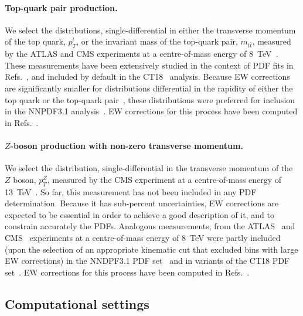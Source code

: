 \paragraph{Top-quark pair production.}
We select the distributions, single-differential in either the transverse
momentum of the top quark, $p_T^t$, or the invariant mass of the top-quark
pair, $m_{t\bar t}$, measured by the ATLAS and CMS experiments at a centre-of-mass
energy of 8~TeV~\cite{Aad:2015mbv,Khachatryan:2015oqa}. These measurements have
been extensively studied in the context of PDF fits in
Refs.~\cite{Czakon:2016olj,Bailey:2019yze,Amoroso:2020lgh,Kadir:2020yml}, and
included by default in the CT18~\cite{Hou:2019efy} analysis.
Because EW corrections are significantly smaller for distributions differential
in the rapidity of either the top quark or the top-quark
pair~\cite{Czakon:2017wor}, these distributions were preferred for inclusion
in the NNPDF3.1 analysis~\cite{Ball:2017nwa}. EW corrections for this process
have been computed in Refs.~\cite{Bernreuther:2010ny,Hollik:2011ps,Kuhn:2011ri,Bernreuther:2012sx,Pagani:2016caq,Czakon:2017wor,Czakon:2017lgo,Czakon:2017mmr,Czakon:2019bcq,Czakon:2019txp}.

\paragraph{$Z$-boson production with non-zero transverse momentum.}
We select the distribution, single-differential in the transverse momentum of
the $Z$ boson, $p_T^Z$, measured by the CMS experiment at a centre-of-mass
energy of 13~TeV~\cite{Sirunyan:2019bzr}. So far, this measurement has not been
included in any PDF determination. Because it has sub-percent uncertainties,
EW corrections are expected to be essential in order to achieve a good
description of it, and to constrain accurately the PDFs. Analogous measurements,
from the ATLAS~\cite{Aad:2015auj} and CMS~\cite{Khachatryan:2015oaa}
experiments at a centre-of-mass energy of 8~TeV were partly included (upon the
selection of an appropriate kinematic cut that excluded bins with large EW
corrections) in the NNDPF3.1 PDF set~\cite{Ball:2017nwa} and in variants of
the CT18 PDF set~\cite{Hou:2019efy}. EW corrections for this process
have been computed in Refs.~\cite{Kuhn:2005az,Denner:2011vu,Hollik:2015pja,Kallweit:2015dum}.

\subsection{Computational settings}
\label{subsec:computational_settings}

